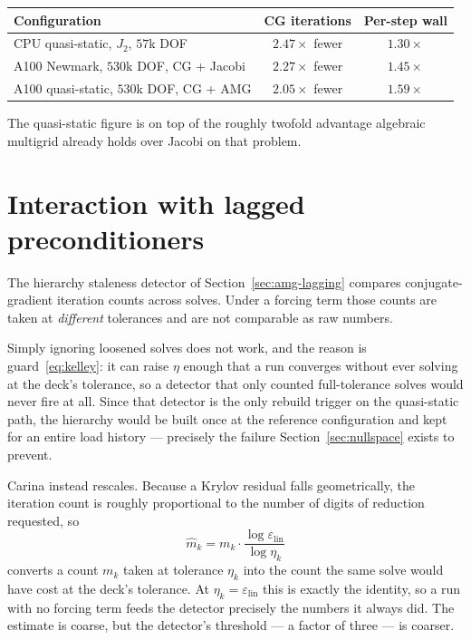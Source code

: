 \begin{center}
\begin{tabular}{@{}lcc@{}}
\toprule
Configuration & CG iterations & Per-step wall \\
\midrule
CPU quasi-static, $J_2$, $57$k DOF        & $2.47\times$ fewer & $1.30\times$ \\
A100 Newmark, $530$k DOF, CG + Jacobi     & $2.27\times$ fewer & $1.45\times$ \\
A100 quasi-static, $530$k DOF, CG + AMG   & $2.05\times$ fewer & $1.59\times$ \\
\bottomrule
\end{tabular}
\end{center}

The quasi-static figure is on top of the roughly twofold advantage algebraic
multigrid already holds over Jacobi on that problem.

\section{Interaction with lagged preconditioners}

The hierarchy staleness detector of Section~\ref{sec:amg-lagging} compares
conjugate-gradient iteration counts across solves.  Under a forcing term those
counts are taken at \emph{different} tolerances and are not comparable as raw
numbers.

Simply ignoring loosened solves does not work, and the reason is
guard~\eqref{eq:kelley}: it can raise $\eta$ enough that a run converges
without ever solving at the deck's tolerance, so a detector that only counted
full-tolerance solves would never fire at all.  Since that detector is the only
rebuild trigger on the quasi-static path, the hierarchy would be built once at
the reference configuration and kept for an entire load history --- precisely
the failure Section~\ref{sec:nullspace} exists to prevent.

Carina instead rescales.  Because a Krylov residual falls geometrically, the
iteration count is roughly proportional to the number of digits of reduction
requested, so
\begin{equation}
  \hat{m}_k = m_k \cdot \frac{\log \varepsilon_{\mathrm{lin}}}{\log \eta_k}
  \label{eq:rescale}
\end{equation}
converts a count $m_k$ taken at tolerance $\eta_k$ into the count the same
solve would have cost at the deck's tolerance.  At $\eta_k =
\varepsilon_{\mathrm{lin}}$ this is exactly the identity, so a run with no
forcing term feeds the detector precisely the numbers it always did.  The
estimate is coarse, but the detector's threshold --- a factor of three ---
is coarser.
